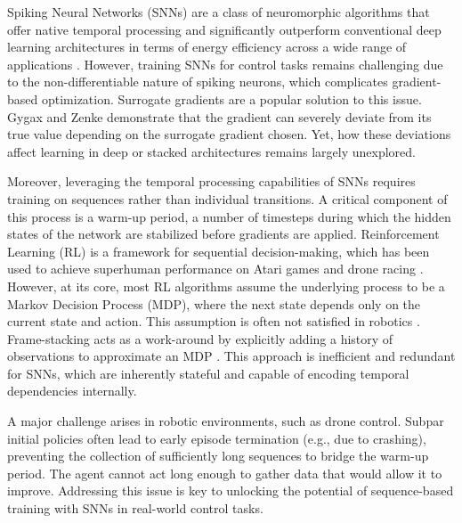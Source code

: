Spiking Neural Networks (SNNs) are a class of neuromorphic algorithms \cite{Maass1997} that offer native temporal processing and significantly outperform conventional deep learning architectures in terms of energy efficiency across a wide range of applications \cite{yik2023neurobench,zhu2023spikegpt, shi2024towards}. However, training SNNs for control tasks remains challenging due to the non-differentiable nature of spiking neurons, which complicates gradient-based optimization. Surrogate gradients \cite{NeftciSurrogate} are a popular solution to this issue. Gygax and Zenke \cite{GygaxElucidating} demonstrate that the gradient can severely deviate from its true value depending on the surrogate gradient chosen. Yet, how these deviations affect learning in deep or stacked architectures remains largely unexplored.

Moreover, leveraging the temporal processing capabilities of SNNs requires training on sequences rather than individual transitions. A critical component of this process is a warm-up period, a number of timesteps during which the hidden states of the network are stabilized before gradients are applied. Reinforcement Learning (RL) is a framework for sequential decision-making, which has been used to achieve superhuman performance on Atari games \cite{mnih2013playingatarideepreinforcement} and drone racing \cite{wurman2022outracing}. However, at its core, most RL algorithms assume the underlying process to be a Markov Decision Process (MDP), where the next state depends only on the current state and action. This assumption is often not satisfied in robotics \cite{Wayne2018, WierstraRecurrentPG}. Frame-stacking acts as a work-around by explicitly adding a history of observations to approximate an MDP \cite{Chen2022,Liu2022,Mnih2016,Eschmann2023}. This approach is inefficient and redundant for SNNs, which are inherently stateful and capable of encoding temporal dependencies internally. 

A major challenge arises in robotic environments, such as drone control. Subpar initial policies often lead to early episode termination (e.g., due to crashing), preventing the collection of sufficiently long sequences to bridge the warm-up period. The agent cannot act long enough to gather data that would allow it to improve. Addressing this issue is key to unlocking the potential of sequence-based training with SNNs in real-world control tasks.

